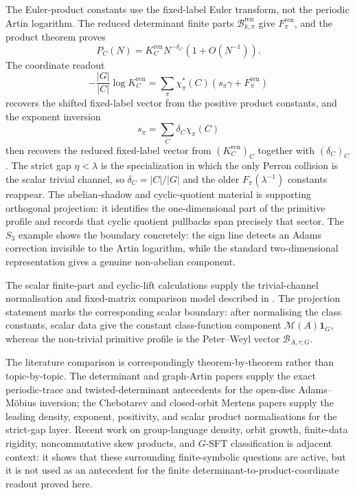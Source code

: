 The Euler-product constants use the fixed-label Euler transform, not the
periodic Artin logarithm.  The reduced determinant finite parts
\(\mathcal B_{k,\pi}^{\mathrm{ren}}\) give
\(F_\pi^{\mathrm{ren}}\), and the product theorem proves
\[
  P_C(N)=K_C^{\mathrm{ren}}N^{-\delta_C}(1+O(N^{-1})).
\]
The coordinate readout
\[
  -\frac{|G|}{|C|}\log K_C^{\mathrm{ren}}
  =
  \sum_\pi\chi_\pi^\ast(C)(s_\pi\gamma+F_\pi^{\mathrm{ren}})
\]
recovers the shifted fixed-label vector from the positive product constants,
and the exponent inversion
\[
  s_\pi=\sum_C\delta_C\chi_\pi(C)
\]
then recovers the reduced fixed-label vector from
\((K_C^{\mathrm{ren}})_C\) together with \((\delta_C)_C\).  The strict gap
\(\eta<\lambda\) is the specialization in
which the only Perron collision is the scalar trivial channel, so
\(\delta_C=|C|/|G|\) and the older \(F_\pi(\lambda^{-1})\) constants reappear.
The abelian-shadow and cyclic-quotient material is supporting orthogonal
projection: it identifies the one-dimensional part of the primitive profile
and records that cyclic quotient pullbacks span precisely that sector. The
\(S_3\) example shows the boundary concretely: the sign line detects an Adams
correction invisible to the Artin logarithm, while the standard
two-dimensional representation gives a genuine non-abelian component.

The scalar finite-part and cyclic-lift calculations supply the
trivial-channel normalisation and fixed-matrix comparison model described in
.  The projection statement marks
the corresponding scalar boundary:
after normalising the class constants, scalar data give the constant
class-function component \(\mathcal M(A)\mathbf 1_G\), whereas the
non-trivial primitive profile is the Peter--Weyl vector
\(\mathcal B_{A,\tau;G}\).

The literature comparison is correspondingly theorem-by-theorem rather than
topic-by-topic.  The determinant and graph-Artin papers supply the exact
periodic-trace and twisted-determinant antecedents for the open-disc
Adams--M\"obius inversion; the Chebotarev and closed-orbit Mertens papers
supply the leading density, exponent, positivity, and scalar product
normalisations for the strict-gap layer.  Recent work on group-language
density, orbit growth, finite-data rigidity, noncommutative skew products, and
\(G\)-SFT classification is adjacent context: it shows that these surrounding
finite-symbolic questions are active, but it is not used as an antecedent for
the finite determinant-to-product-coordinate readout proved here.
